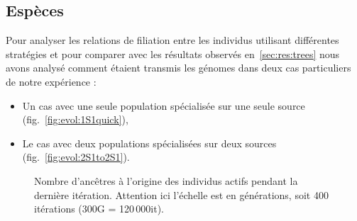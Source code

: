 \documentclass[a4paper,10pt]{report}
\begin{document}
	
	
	
	\subsection{Espèces}
	Pour analyser les relations de filiation entre les individus utilisant différentes stratégies et pour comparer avec les résultats observés en~\ref{sec:res:trees} nous avons analysé comment étaient transmis les génomes dans deux cas particuliers de notre expérience :
	
	\begin{itemize}
	\item Un cas avec une seule population spécialisée sur une seule source (fig.~\ref{fig:evol:1S1quick}),
	\item Le cas avec deux populations spécialisées sur deux sources (fig.~\ref{fig:evol:2S1to2S1}).
	\end{itemize}
	
	
	
	\begin{figure}[H]
	\hspace{.2cm}
	\caption[Pères fondateurs]{Nombre d'ancêtres à l'origine des individus actifs pendant la dernière itération. Attention ici l'échelle est en générations, soit 400 itérations (300G = 120\,000it).}
	\label{fig:ancestors}
	\end{figure}
	
\end{document}
